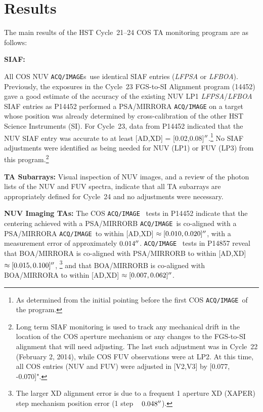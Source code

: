 \section{Results}\label{sec:results}
The main results of the HST Cycle~21--24 COS TA monitoring program are as follows:
\begin{description}
\item{\bf SIAF:}{
	All COS NUV \texttt{ACQ/IMAGE}s~use identical SIAF entries ({\it LFPSA} or {\it LFBOA}).
	Previously, the exposures in the Cycle~23 FGS-to-SI Alignment program (14452) gave a good estimate of the accuracy of the existing NUV LP1 {\it LFPSA}/{\it LFBOA} SIAF entries
	as P14452 performed a PSA/MIRRORA \texttt{ACQ/IMAGE} on a target whose position was already determined by cross-calibration of the other HST Science Instruments (SI).
	For Cycle~23, data from P14452 indicated that the NUV SIAF entry was accurate to at least [AD,XD] = [0.02,0.08]$\hbox{$^{\prime\prime}$}$.\footnote{As determined from the initial pointing before the first COS \texttt{ACQ/IMAGE}~of the program.}
	No SIAF adjustments were identified as being needed for NUV (LP1) or FUV (LP3) from this program.\footnote{Long term SIAF monitoring is used to track any mechanical drift in the location of the COS aperture mechanism or any changes to the FGS-to-SI alignment that will need adjusting.
	The last such adjustment was in Cycle~22 (February 2, 2014), while COS FUV observations were at LP2. At this time, all COS entries (NUV and FUV) were adjusted in [V2,V3] by [0.077, -0.070]". }

}
\item{\bf TA Subarrays:} Visual inspection of NUV images, and a review of the photon lists of the NUV and FUV spectra, indicate that all TA subarrays are appropriately defined for Cycle~24 and no adjustments were necessary.
\item{\bf NUV Imaging TAs:}
	The COS \texttt{ACQ/IMAGE}~ tests in P14452 indicate that the centering achieved with a PSA/MIRRORB \texttt{ACQ/IMAGE}~is co-aligned with a PSA/MIRRORA \texttt{ACQ/IMAGE}~to within [AD,XD] $\approx [0.010,0.020]\hbox{$^{\prime\prime}$}$, with a measurement error of approximately $0.014\hbox{$^{\prime\prime}$}$.
	\texttt{ACQ/IMAGE}~ tests in P14857 reveal that BOA/MIRRORA is co-aligned with PSA/MIRRORB to within [AD,XD] $\approx [0.015,0.100]\hbox{$^{\prime\prime}$}$,
	\footnote{The larger XD alignment error is due to a frequent 1 aperture XD (XAPER) step mechanism position error (1 step ~ $0.048\hbox{$^{\prime\prime}$}$).}
	and that BOA/MIRRORB is co-aligned with BOA/MIRRORA to within [AD,XD] $\approx [0.007,0.062]\hbox{$^{\prime\prime}$}$.


\end{description}
